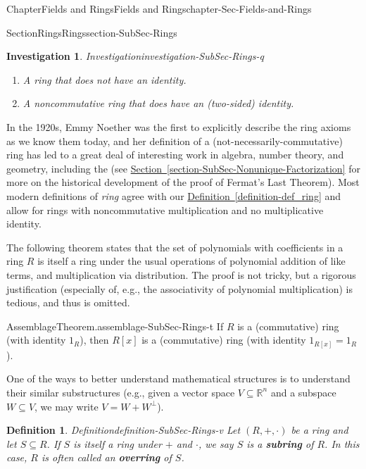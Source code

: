 \documentclass[oneside,10pt,]{book}
\newcommand{\xreffont}{\relax}
\newcommand{\terminology}[1]{\textbf{#1}}
\numberwithin{equation}{section}
\def\R{{\mathbb R}}
\newtheorem{definition}[theorem]{Definition}
\newtheorem{investigation}[theorem]{Investigation}
\begin{document}
\begin{chapterptx}{Chapter}{Fields and Rings}{}{Fields and Rings}{}{}{chapter-Sec-Fields-and-Rings}
\begin{sectionptx}{Section}{Rings}{}{Rings}{}{}{section-SubSec-Rings}
\begin{investigation}{Investigation}{}{investigation-SubSec-Rings-q}
\begin{enumerate}
\item{}A ring that does not have an identity\footnotemark{}.%
\item{}A noncommutative ring that \emph{does} have an (two-sided) identity.%
\end{enumerate}
%
\end{investigation}%
%
%
In the 1920s, Emmy Noether was the first to explicitly describe the ring axioms as we know them today, and her definition of a (not-necessarily-commutative) ring has led to a great deal of interesting work in algebra, number theory, and geometry, including the (see \hyperref[section-SubSec-Nonunique-Factorization]{Section~{\xreffont\ref{section-SubSec-Nonunique-Factorization}}} for more on the historical development of the proof of Fermat's Last Theorem). Most modern definitions of \emph{ring} agree with our \hyperref[definition-def_ring]{Definition~{\xreffont\ref{definition-def_ring}}} and allow for rings with noncommutative multiplication and no multiplicative identity.%
\par
The following theorem states that the set of polynomials with coefficients in a ring \(R\) is itself a ring under the usual operations of polynomial addition of like terms, and multiplication via distribution. The proof is not tricky, but a rigorous justification (especially of, e.g., the associativity of polynomial multiplication) is tedious, and thus is omitted.%
\begin{assemblage}{Assemblage}{Theorem.}{assemblage-SubSec-Rings-t}%
If \(R\) is a (commutative) ring (with identity \(1_R\)), then \(R[x]\) is a (commutative) ring (with identity \(1_{R[x]} = 1_R\)).%
\end{assemblage}
One of the ways to better understand mathematical structures is to understand their similar substructures (e.g., given a vector space \(V\subseteq \R^n\) and a subspace \(W\subseteq V\), we may write \(V = W + W^\perp\)). %
\begin{definition}{Definition}{}{definition-SubSec-Rings-v}%
%
%
Let \((R,+,\cdot)\) be a ring and let \(S\subseteq R\). If \(S\) is itself a ring under \(+\) and \(\cdot\), we say \(S\) is a \terminology{subring} of \(R\). In this case, \(R\) is often called an \terminology{overring} of \(S\).%

\end{definition}
\end{sectionptx}
\end{chapterptx}
\end{document}
